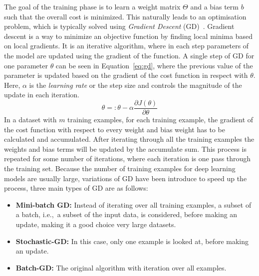 The goal of the training phase is to learn a weight matrix $\Theta$ and a bias term $b$ such that the overall cost is minimized. This naturally leads to an optimisation problem, which is  typically solved using \emph{Gradient Descent} (GD)~.
Gradient descent is a way to minimize an objective function by finding local minima based on local gradients.
It is an iterative algorithm, where in each step parameters of the model are updated using the gradient of the function. A single step of GD  for one parameter $\theta$ can be seen in Equation~\ref{eq:gd}, where the previous value of the parameter is updated based on the gradient of the cost function in respect with $\theta$. Here, $\alpha$ is the \emph{learning rate} or the step size and controls the magnitude of the update in each iteration. 
\begin{equation}
\theta=: \theta- \alpha\frac { \partial J(\theta) }{ \partial \theta }
\label{eq:gd}
\end{equation}
In a dataset with $m$ training examples, for each training example, the gradient of the cost function with respect to every weight and bias weight has to be calculated and accumulated.
After iterating through all the training examples the weights and bias terms will be updated by the accumulate sum. This process is repeated for some number of iterations, where each iteration is one pass through the training set. Because the number of training examples for deep learning models are usually large, variations of GD have been introduce to speed up the process, three main types of GD are as follows: 
\begin{itemize}
\item \textbf{Mini-batch GD:} Instead of iterating over all training examples, a subset of a batch, i.e.,\ a subset of the input data, is considered, before making an update, making it a good choice very large datasets.
\item \textbf{Stochastic-GD:} In this case, only one example is looked at, before making an update. 
\item \textbf{Batch-GD:} The original algorithm with iteration over all examples. 
\end{itemize} 
